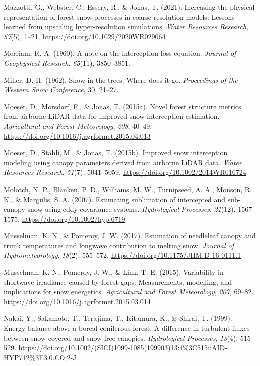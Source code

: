 \documentclass[
  letterpaper,
]{tex/uofsthesis-cs}
\newlength{\cslhangindent}
\newenvironment{CSLReferences}[2] %
 {\begin{list}{}{%
  \setlength{\itemindent}{0pt}
  \setlength{\leftmargin}{0pt}
  \setlength{\parsep}{0pt}
  \ifodd #1
   \setlength{\leftmargin}{\cslhangindent}
   \setlength{\itemindent}{-1\cslhangindent}
  \fi
  \setlength{\itemsep}{#2\baselineskip}}}
 {\end{list}}
\begin{document}
\begin{CSLReferences}{1}{0}
Mazzotti, G., Webster, C., Essery, R., \& Jonas, T. (2021). Increasing
the physical representation of forest-snow processes in
coarse-resolution models: {Lessons} learned from upscaling
hyper-resolution simulations. \emph{Water Resources Research},
\emph{57}(5), 1--21. \url{https://doi.org/10.1029/2020WR029064}

Merriam, R. A. (1960). A note on the interception loss equation.
\emph{Journal of Geophysical Research}, \emph{65}(11), 3850--3851.

Miller, D. H. (1962). Snow in the trees: {Where} does it go.
\emph{Proceedings of the Western Snow Conference}, 30, 21--27.

Moeser, D., Morsdorf, F., \& Jonas, T. (2015a). Novel forest structure
metrics from airborne {LiDAR} data for improved snow interception
estimation. \emph{Agricultural and Forest Meteorology}, \emph{208},
40--49. \url{https://doi.org/10.1016/j.agrformet.2015.04.013}

Moeser, D., Stähli, M., \& Jonas, T. (2015b). Improved snow interception
modeling using canopy parameters derived from airborne {LiDAR} data.
\emph{Water Resources Research}, \emph{51}(7), 5041--5059.
\url{https://doi.org/10.1002/2014WR016724}

Molotch, N. P., Blanken, P. D., Williams, M. W., Turnipseed, A. A.,
Monson, R. K., \& Margulis, S. A. (2007). Estimating sublimation of
intercepted and sub-canopy snow using eddy covariance systems.
\emph{Hydrological Processes}, \emph{21}(12), 1567--1575.
\url{https://doi.org/10.1002/hyp.6719}

Musselman, K. N., \& Pomeroy, J. W. (2017). Estimation of needleleaf
canopy and trunk temperatures and longwave contribution to melting snow.
\emph{Journal of Hydrometeorology}, \emph{18}(2), 555--572.
\url{https://doi.org/10.1175/JHM-D-16-0111.1}

Musselman, K. N., Pomeroy, J. W., \& Link, T. E. (2015). Variability in
shortwave irradiance caused by forest gaps: {Measurements}, modelling,
and implications for snow energetics. \emph{Agricultural and Forest
Meteorology}, \emph{207}, 69--82.
\url{https://doi.org/10.1016/j.agrformet.2015.03.014}

Nakai, Y., Sakamoto, T., Terajima, T., Kitamura, K., \& Shirai, T.
(1999). Energy balance above a boreal coniferous forest: {A} difference
in turbulent fluxes between snow-covered and snow-free canopies.
\emph{Hydrological Processes}, \emph{13}(4), 515--529.
\url{https://doi.org/10.1002/(SICI)1099-1085(199903)13:4\%3C515::AID-HYP712\%3E3.0.CO;2-J}


\end{CSLReferences}
\end{document}
